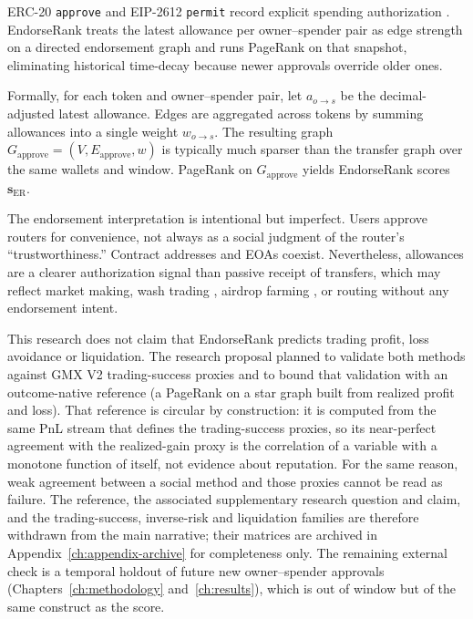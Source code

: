 
ERC-20 \texttt{approve} and EIP-2612 \texttt{permit} record explicit spending authorization . EndorseRank treats the latest allowance per owner--spender pair as edge strength on a directed endorsement graph and runs PageRank on that snapshot, eliminating historical time-decay because newer approvals override older ones.

Formally, for each token and owner--spender pair, let $a_{o\to s}$ be the decimal-adjusted latest allowance. Edges are aggregated across tokens by summing allowances into a single weight $w_{o\to s}$. The resulting graph $G_{\text{approve}}=(V,E_{\text{approve}},w)$ is typically much sparser than the transfer graph over the same wallets and window. PageRank on $G_{\text{approve}}$ yields EndorseRank scores $\mathbf{s}_{\mathrm{ER}}$.

The endorsement interpretation is intentional but imperfect. Users approve routers for convenience, not always as a social judgment of the router's ``trustworthiness.'' Contract addresses and EOAs coexist. Nevertheless, allowances are a clearer authorization signal than passive receipt of transfers, which may reflect market making, wash trading , airdrop farming , or routing without any endorsement intent.


This research does not claim that EndorseRank predicts trading profit, loss avoidance or liquidation. The research proposal planned to validate both methods against GMX V2 trading-success proxies and to bound that validation with an outcome-native reference (a PageRank on a star graph built from realized profit and loss). That reference is circular by construction: it is computed from the same PnL stream that defines the trading-success proxies, so its near-perfect agreement with the realized-gain proxy is the correlation of a variable with a monotone function of itself, not evidence about reputation. For the same reason, weak agreement between a social method and those proxies cannot be read as failure. The reference, the associated supplementary research question and claim, and the trading-success, inverse-risk and liquidation families are therefore withdrawn from the main narrative; their matrices are archived in Appendix~\ref{ch:appendix-archive} for completeness only. The remaining external check is a temporal holdout of future new owner--spender approvals (Chapters~\ref{ch:methodology} and~\ref{ch:results}), which is out of window but of the same construct as the score.

